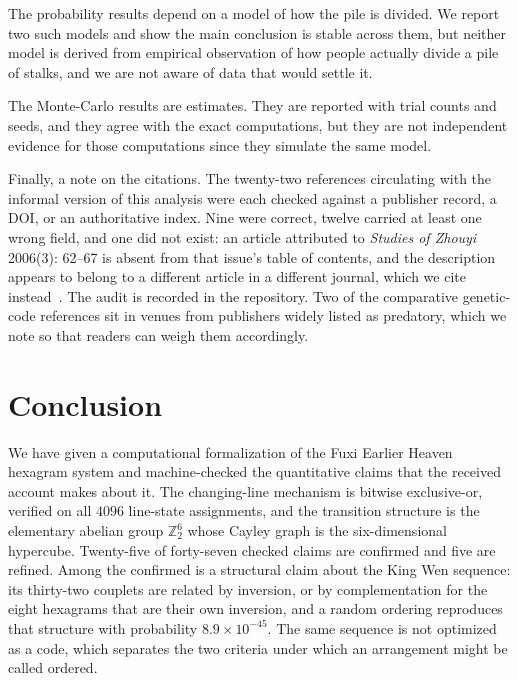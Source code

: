 \documentclass[11pt,a4paper]{article}
\newcommand{\Ztwo}{\mathbb{Z}_2}
\begin{document}
The probability results depend on a model of how the pile is divided. We report
two such models and show the main conclusion is stable across them, but neither
model is derived from empirical observation of how people actually divide a pile
of stalks, and we are not aware of data that would settle it.

The Monte-Carlo results are estimates. They are reported with trial counts and
seeds, and they agree with the exact computations, but they are not independent
evidence for those computations since they simulate the same model.

Finally, a note on the citations. The twenty-two references circulating with the
informal version of this analysis were each checked against a publisher record,
a DOI, or an authoritative index. Nine were correct, twelve carried at least one
wrong field, and one did not exist: an article attributed to \emph{Studies of
Zhouyi} 2006(3): 62--67 is absent from that issue's table of contents, and the
description appears to belong to a different article in a different journal,
which we cite instead~\cite{sun2018dayan}. The audit is recorded in the
repository. Two of the comparative genetic-code references sit in venues from
publishers widely listed as predatory, which we note so that readers can weigh
them accordingly.

\section{Conclusion}

We have given a computational formalization of the Fuxi Earlier Heaven hexagram
system and machine-checked the quantitative claims that the received account
makes about it. The changing-line mechanism is bitwise exclusive-or, verified on
all $4096$ line-state assignments, and the transition structure is the
elementary abelian group $\Ztwo^6$ whose Cayley graph is the six-dimensional
hypercube. Twenty-five of forty-seven checked claims are confirmed and five are
refined. Among the confirmed is a structural claim about the King Wen sequence:
its thirty-two couplets are related by inversion, or by complementation for the
eight hexagrams that are their own inversion, and a random ordering reproduces
that structure with probability $8.9 \times 10^{-45}$. The same sequence is not
optimized as a code, which separates the two criteria under which an arrangement
might be called ordered.
\end{document}

